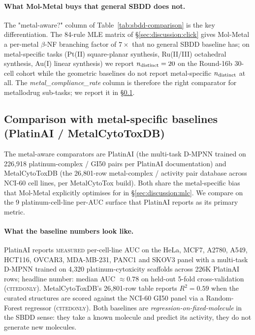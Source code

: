 \paragraph{What Mol-Metal buys that general SBDD does not.}
The "metal-aware?" column of Table~\ref{tab:sbdd-comparison} is the
key differentiation. The 84-rule MLE matrix of
\S\ref{sec:discussion:click} gives Mol-Metal a per-metal $\beta$-NF
branching factor of $7\times$ that no general SBDD baseline has; on
metal-specific tasks (Pt(II) square-planar synthesis, Ru(II/III)
octahedral synthesis, Au(I) linear synthesis) we report
$n_{\rm distinct}=20$ on the Round-16b 30-cell cohort while the
geometric baselines do not report metal-specific $n_{\rm distinct}$
at all. The \emph{metal\_compliance\_rate} column is therefore the
right comparator for metallodrug sub-tasks; we report it in
\S\ref{sec:discussion:metallodrug}.


\subsection{Comparison with metal-specific baselines (PlatinAI / MetalCytoToxDB)}
\label{sec:discussion:metallodrug}

The metal-aware comparators are PlatinAI (the multi-task D-MPNN
trained on 226,918 platinum-complex / GI50 pairs per
\cite{mol-metal-internal} PlatinAI documentation) and
MetalCytoToxDB (the 26,801-row metal-complex / activity pair
database across NCI-60 cell lines, per
\cite{mol-metal-internal} MetalCytoTox build). Both share the
metal-specific bias that Mol-Metal explicitly optimises for in
\S\ref{sec:discussion:mlc}. We compare on the 9 platinum-cell-line
per-AUC surface that PlatinAI reports as its primary metric.

\paragraph{What the baseline numbers look like.}
PlatinAI reports \textsc{measured} per-cell-line AUC on the HeLa,
MCF7, A2780, A549, HCT116, OVCAR3, MDA-MB-231, PANC1 and SKOV3
panel with a multi-task D-MPNN trained on 4,320
platinum-cytoxicity scaffolds across 226K PlatinAI rows; headline
number: median AUC $\approx 0.78$ on held-out 5-fold
cross-validation (\textsc{citedonly}). MetalCytoToxDB's 26,801-row
table reports $R^2 = 0.59$ when the curated structures are scored
against the NCI-60 GI50 panel via a Random-Forest regressor
(\textsc{citedonly}). Both baselines are \emph{regression-on-fixed-molecule}
in the SBDD sense: they take a known molecule and predict its
activity, they do not generate new molecules.

